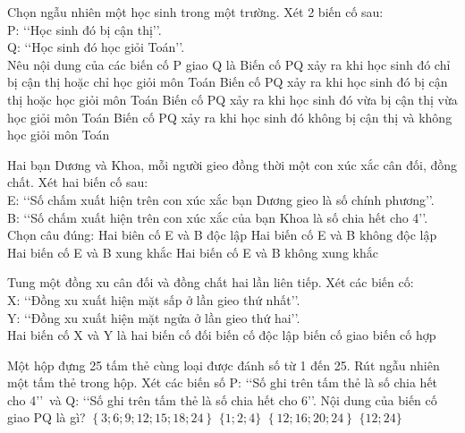 \begin{ex}%
	Chọn ngẫu nhiên một học sinh trong một trường. Xét 2 biến cố sau:\\
	P: \lq\lq Học sinh đó bị cận thị\rq\rq .\\
	Q: \lq\lq Học sinh đó học giỏi Toán\rq\rq .\\
	Nêu nội dung của các biến cố P giao Q là 
	\choice
	{Biến cố PQ xảy ra khi học sinh đó chỉ bị cận thị hoặc chỉ học giỏi môn Toán}
	{Biến cố PQ xảy ra khi học sinh đó bị cận thị hoặc học giỏi môn Toán}
	{\True Biến cố PQ xảy ra khi học sinh đó vừa bị cận thị vừa học giỏi môn Toán}
	{Biến cố PQ xảy ra khi học sinh đó không bị cận thị và không học giỏi môn Toán}
\end{ex}
\begin{ex}%
	Hai bạn Dương và Khoa, mỗi người gieo đồng thời một con xúc xắc cân đối, đồng chất. Xét hai biến cố sau:\\
	E: \lq\lq Số chấm xuất hiện trên con xúc xắc bạn Dương gieo là số chính phương\rq\rq .\\
	B: \lq\lq Số chấm xuất hiện trên con xúc xắc của bạn Khoa là số chia hết cho 4\rq\rq .\\
	Chọn câu đúng: 
	\choice
	{\True Hai biên cố E và B độc lập}
	{Hai biến cố E và B không độc lập}
	{Hai biến cố E và B xung khắc}
	{Hai biến cố E và B không xung khắc}
\end{ex}
\begin{ex}%
	Tung một đồng xu cân đối và đồng chất hai lần liên tiếp. Xét các biến cố:\\
	X: \lq\lq Đồng xu xuất hiện mặt sấp ở lần gieo thứ nhất\rq\rq .\\
	Y: \lq\lq Đồng xu xuất hiện mặt ngửa ở lần gieo thứ hai\rq\rq .\\
	Hai biến cố X và Y là hai 
	\choice
	{biến cố đối}
	{\True biến cố độc lập}
	{biến cố giao}
	{biến cố hợp}
\end{ex}
\begin{ex}%
	Một hộp đựng 25 tấm thẻ cùng loại được đánh số từ 1 đến 25. Rút ngẫu nhiên một tấm thẻ trong hộp. Xét các biến số P: \lq\lq Số ghi trên tấm thẻ là số chia hết cho 4\rq\rq \, và Q: \lq\lq Số ghi trên tấm thẻ là số chia hết cho 6\rq\rq.  Nội dung của biến cố giao PQ là gì?
	\choice
	{$\left\{3;6;9;12;15;18;24\right\}$}
	{$\{1;2;4\}$}
	{$\left\{12;16;20;24\right\}$}
	{\True $\{12;24\}$}
\end{ex}
